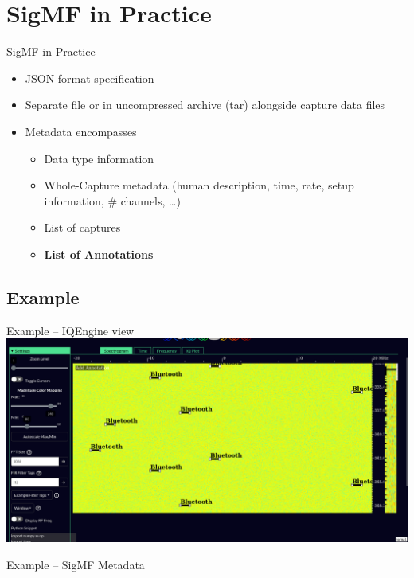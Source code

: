 \section{SigMF in Practice}
\begin{frame}{SigMF in Practice}
  \begin{itemize}
    \item JSON format specification
    \item Separate file or in uncompressed archive (tar) alongside capture data files\\[2em]

    \item Metadata encompasses
      \begin{itemize}
        \item Data type information
        \item Whole-Capture metadata (human description, time, rate, setup information, \# channels, \ldots)
        \item List of captures
        \item \textbf{List of Annotations}
      \end{itemize}
  \end{itemize}
\end{frame}

\subsection{Example}
\begin{frame}{Example -- IQEngine view}
  \includegraphics[width=\textwidth,keepaspectratio]{screen.png}
\end{frame}

\begin{frame}{\quad Example -- SigMF Metadata}
  \vspace{-1.5em}
  \begin{columns}
    \begin{column}{0.48\textwidth}
  \scriptsize\inputminted[lastline=24]{json}{meta.json}
  \end{column}
    \begin{column}{0.48\textwidth}
  \scriptsize\inputminted[firstline=25,lastline=48]{json}{meta.json}
  \end{column}
  \end{columns}
\end{frame}

